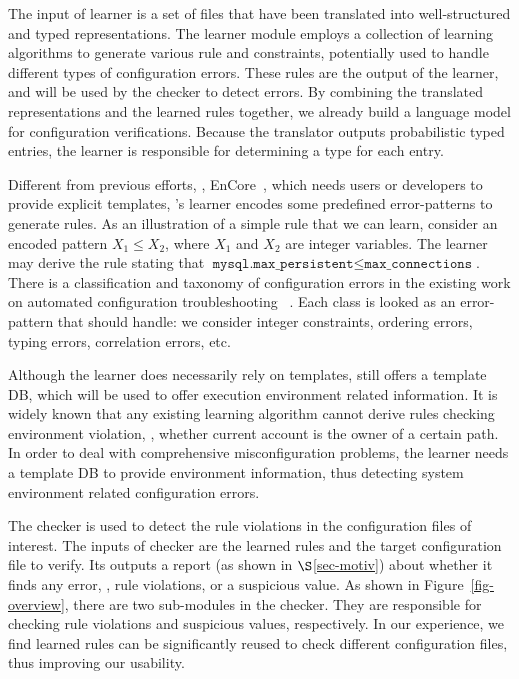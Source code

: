 The input of learner is a set of files that have been translated
into well-structured and typed representations.
The learner module employs a collection of learning algorithms
to generate various rule and constraints,
potentially used to handle different types of configuration errors.
These rules are the output of the learner, and will be 
used by the checker to detect errors.
By combining the translated representations and the learned
rules together, we already build a language model for
configuration verifications.
Because the translator outputs probabilistic typed entries,
the learner is responsible for determining a type for each entry.

Different from previous efforts, \eg, EnCore~\cite{zhang14encore},
which needs users or developers to provide explicit templates,
\app's learner encodes some predefined error-patterns 
to generate rules. 
As an illustration of a simple rule that we can learn,
consider an encoded pattern $X_1 \le X_2$, where $X_1$ and $X_2$ are
integer variables. The learner may derive the rule stating that
$\texttt{mysql.max\_persistent} \le \texttt{max\_connections}$. 
There is a classification and taxonomy of configuration errors in the 
existing work on automated configuration troubleshooting%
~\cite{yin11anempirical, configdataset}. 
Each class is looked as an error-pattern 
that \app should handle: we consider integer constraints, 
ordering errors, typing errors, correlation errors, etc.

Although the learner does necessarily rely on templates,
\app still offers a template DB, which will be used to offer
execution environment related information.
It is widely known that any existing learning algorithm cannot
derive rules checking environment violation, \eg,
whether current account is the owner of a certain path.
In order to deal with comprehensive misconfiguration problems,
the learner needs a template DB to provide environment information,
thus detecting system environment related configuration errors.

The checker is used to detect the rule violations in the configuration
files of interest. The inputs of checker are the learned rules 
and the target configuration file to verify.
Its outputs a report (as shown in $\S$\ref{sec-motiv}) about 
whether it finds any error, \eg, rule violations, or a suspicious value.
As shown in Figure~\ref{fig-overview},
there are two sub-modules in the checker. They are responsible for
checking rule violations and suspicious values, respectively.
In our experience, we find learned rules can be significantly reused
to check different configuration files, thus improving our usability.  
